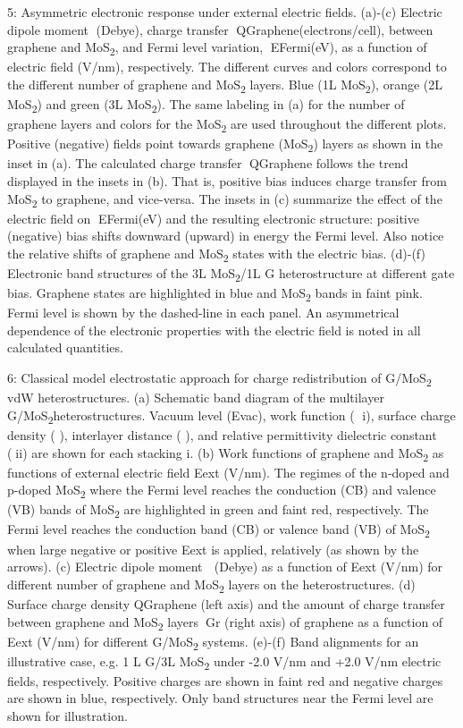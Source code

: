  5: Asymmetric electronic response under external electric fields. (a)-(c) Electric dipole moment (Debye), charge transfer QGraphene(electrons/cell), between graphene and MoS\textsubscript{2}, and Fermi level variation, EFermi(eV), as a function of electric field (V/nm), respectively. The different curves and colors correspond to the different number of graphene and MoS\textsubscript{2} layers. Blue (1L MoS\textsubscript{2}), orange (2L MoS\textsubscript{2}) and green (3L MoS\textsubscript{2}). The same labeling in (a) for the number of graphene layers and colors for the MoS\textsubscript{2} are used throughout the different plots. Positive (negative) fields point towards graphene (MoS\textsubscript{2}) layers as shown in the inset in (a). The calculated charge transfer QGraphene follows the trend displayed in the insets in (b).  That is, positive bias induces charge transfer from MoS\textsubscript{2} to graphene, and vice-versa. The insets in (c) summarize the effect of the electric field on EFermi(eV) and the resulting electronic structure: positive (negative) bias shifts downward (upward) in energy the Fermi level. Also notice the relative shifts of graphene and MoS\textsubscript{2} states with the electric bias. (d)-(f) Electronic band structures of the 3L MoS\textsubscript{2}/1L G heterostructure at different gate bias. Graphene states are highlighted in blue and MoS\textsubscript{2} bands in faint pink. Fermi level is shown by the dashed-line in each panel. An asymmetrical dependence of the electronic properties with the electric field is noted in all calculated quantities. 

 
 6: Classical model electrostatic approach for charge redistribution of G/MoS\textsubscript{2} vdW heterostructures. (a) Schematic band diagram of the multilayer G/MoS\textsubscript{2}heterostructures. Vacuum level (Evac), work function ( i), surface charge density ( ), interlayer distance ( ),  and relative permittivity dielectric constant (ii) are shown for each stacking i. (b) Work functions of graphene and MoS\textsubscript{2} as functions of external electric field Eext (V/nm). The regimes of the n-doped and p-doped MoS\textsubscript{2} where the Fermi level reaches the conduction (CB) and valence (VB) bands of MoS\textsubscript{2} are highlighted in green and faint red, respectively. The Fermi level reaches the conduction band (CB) or valence band (VB) of MoS\textsubscript{2} when large negative or positive Eext is applied, relatively (as shown by the arrows). (c) Electric dipole moment  (Debye) as a function of Eext (V/nm) for different number of graphene and MoS\textsubscript{2} layers on the heterostructures. (d) Surface charge density QGraphene (left axis) and the amount of charge transfer between graphene and MoS\textsubscript{2} layersGr (right axis) of graphene as a function of Eext (V/nm) for different G/MoS\textsubscript{2} systems. (e)-(f) Band alignments for an illustrative case, e.g. 1 L G/3L MoS\textsubscript{2} under -2.0 V/nm and +2.0 V/nm electric fields, respectively. Positive charges are shown in faint red and negative charges are shown in blue, respectively. Only band structures near the Fermi level are shown for illustration. 
 
